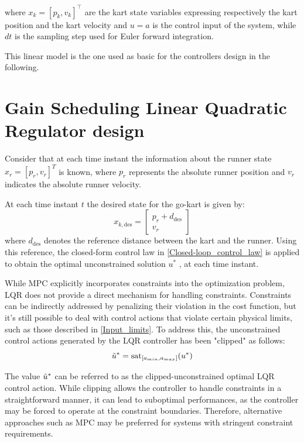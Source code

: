 \documentclass[a4paper,12pt,oneside]{book}
\begin{document}
where $x_k = [p_k , v_k] ^\top$  are the kart state variables expressing respectively the kart position and the kart velocity and $u = a$ is the control input of the system, while $dt$ is the sampling step used for Euler forward integration.

This linear model is the one used as basic for the controllers design in the following.




\section{Gain Scheduling Linear Quadratic Regulator design}
Consider that at each time instant the information about the runner state $x_r =[p_r , v_r] ^T $ is known, where $p_r$ represents the absolute runner position and $v_r$ indicates the absolute runner velocity.

At each time instant $t$ the desired state for the go-kart is given by:
\begin{equation}
    x_{k,\text{des}} =
    \begin{bmatrix}
        p_r + d_{\text{des}} \\
        v_r
    \end{bmatrix}
\end{equation}
where $d_{\text{des}}$ denotes the reference distance between the kart and the runner.
Using this reference, the closed-form control law in \ref{Closed-loop_control_law} is applied to obtain the optimal unconstrained solution $u^*$ , at each time instant.

\bigskip
While MPC explicitly incorporates constraints into the optimization problem, LQR does not provide a direct mechanism for handling constraints.
Constraints can be indirectly addressed by penalizing their violation in the cost function, but it's still possible to deal with control actions that violate certain physical limits, such as those described in \ref{Input_limits}.
To address this, the unconstrained control actions generated by the LQR controller has been "clipped" as follows:
\begin{equation}
    \Tilde{u}^* = \text{sat}_{[a_{min}, a_{max}]} (u^*)
\end{equation}

The value $\Tilde{u}^*$ can be referred to as the clipped-unconstrained optimal LQR control action.
While clipping allows the controller to handle constraints in a straightforward manner, it can lead to suboptimal performances, as the controller may be forced to operate at the constraint boundaries.
Therefore, alternative approaches such as MPC may be preferred for systems with stringent constraint requirements.
\end{document}
